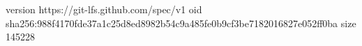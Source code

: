 version https://git-lfs.github.com/spec/v1
oid sha256:988f4170fde37a1c25d8ed8982b54c9a485fe0b9cf3be7182016827e052ff0ba
size 145228
